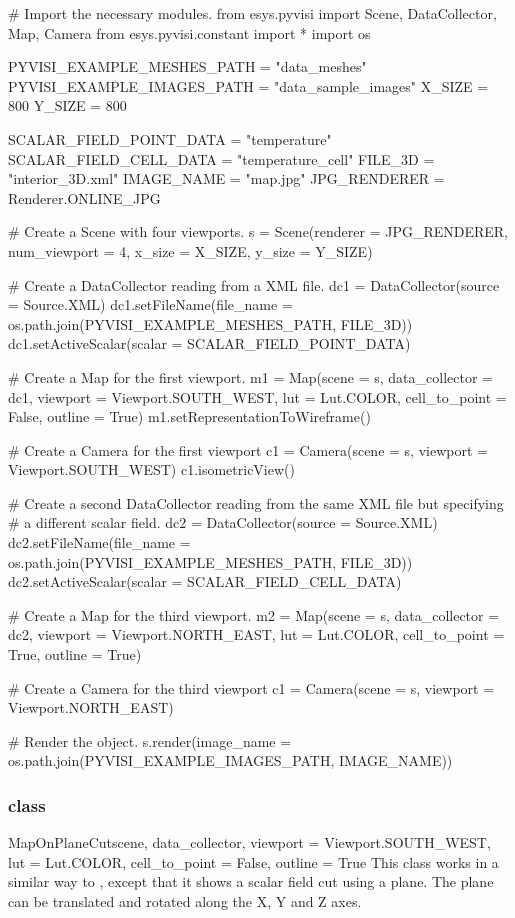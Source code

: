 \begin{python}
# Import the necessary modules.
from esys.pyvisi import Scene, DataCollector, Map, Camera
from esys.pyvisi.constant import *
import os

PYVISI_EXAMPLE_MESHES_PATH = "data_meshes"
PYVISI_EXAMPLE_IMAGES_PATH = "data_sample_images"
X_SIZE = 800
Y_SIZE = 800

SCALAR_FIELD_POINT_DATA = "temperature"
SCALAR_FIELD_CELL_DATA = "temperature_cell"
FILE_3D = "interior_3D.xml"
IMAGE_NAME = "map.jpg"
JPG_RENDERER = Renderer.ONLINE_JPG

# Create a Scene with four viewports.
s = Scene(renderer = JPG_RENDERER, num_viewport = 4, x_size = X_SIZE, 
        y_size = Y_SIZE)

# Create a DataCollector reading from a XML file.
dc1 = DataCollector(source = Source.XML)
dc1.setFileName(file_name = os.path.join(PYVISI_EXAMPLE_MESHES_PATH, FILE_3D))
dc1.setActiveScalar(scalar = SCALAR_FIELD_POINT_DATA)

# Create a  Map for the first viewport.
m1 = Map(scene = s, data_collector = dc1, viewport = Viewport.SOUTH_WEST, 
        lut = Lut.COLOR, cell_to_point = False, outline = True)
m1.setRepresentationToWireframe()

# Create a Camera for the first viewport
c1 = Camera(scene = s, viewport = Viewport.SOUTH_WEST)
c1.isometricView()

# Create a second DataCollector reading from the same XML file but specifying
# a different scalar field.
dc2 = DataCollector(source = Source.XML)
dc2.setFileName(file_name = os.path.join(PYVISI_EXAMPLE_MESHES_PATH, FILE_3D))
dc2.setActiveScalar(scalar = SCALAR_FIELD_CELL_DATA)

# Create a Map for the third viewport.
m2 = Map(scene = s, data_collector = dc2, viewport = Viewport.NORTH_EAST, 
        lut = Lut.COLOR, cell_to_point = True, outline = True)

# Create a Camera for the third viewport
c1 = Camera(scene = s, viewport = Viewport.NORTH_EAST)

# Render the object.
s.render(image_name = os.path.join(PYVISI_EXAMPLE_IMAGES_PATH, IMAGE_NAME))
\end{python}

\subsubsection{\MapOnPlaneCut class}

\begin{classdesc}{MapOnPlaneCut}{scene, data_collector, 
viewport = Viewport.SOUTH_WEST, lut = Lut.COLOR, cell_to_point = False, 
outline = True}
This class works in a similar way to \Map, except that it shows a scalar 
field cut using a plane. The plane can be translated and rotated along the 
X, Y and Z axes.
\end{classdesc}

